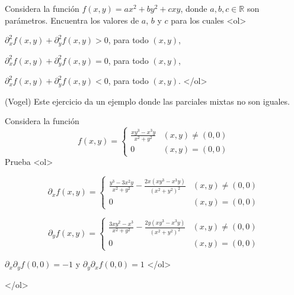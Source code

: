 \documentclass{article}
\theoremstyle{definition}
\begin{document}
                
  \item Considera la función $f(x,y)=ax^2+by^2+cxy$,
    donde $a,b,c\in \mathbb{R}$ son parámetros. Encuentra
    los valores de $a$, $b$ y $c$ para los cuales
    <ol>
    \item $\partial_x^2 f(x,y)+\partial_y^2f(x,y) >0$, para todo $(x,y)$,
    \item $\partial_x^2f(x,y)+\partial_y^2f(x,y)=0$, para todo $(x,y)$,
    \item $\partial_x^2f(x,y)+\partial_y^2f(x,y)<0$, para todo $(x,y)$.
    </ol>
                  
 
    
  \item (Vogel) Este ejercicio da un ejemplo
    donde las parciales mixtas no son iguales.

    Considera la función
    $$
    f(x,y)=\left\{
      \begin{array}{cc}
        \frac{xy^3-x^3y}{x^2+y^2} & (x,y)\ne (0,0)\\
        0 & (x,y)=(0,0)
      \end{array}
    \right.
    $$
    Prueba
    <ol>
    \item
      $$
      \partial_xf(x,y)=\left\{
        \begin{array}{cc}
          \frac{y^3-3x^2y}{x^2+y^2}- \frac{2x(xy^3-x^3y)}{(x^2+y^2)^2}
          & (x,y)\ne (0,0)\\
          0 & (x,y)=(0,0)
        \end{array}
      \right.
      $$
    \item
      $$
      \partial_y f(x,y)=\left\{
        \begin{array}{cc}
          \frac{3xy^2-x^3}{x^2+y^2}- \frac{2y(xy^3-x^3y)}{(x^2+y^2)^2}
          & (x,y)\ne (0,0)\\
          0 & (x,y)=(0,0)
        \end{array}
      \right.
      $$
      
    \item $\partial_x \partial_yf(0,0)=-1$ y $\partial_y\partial_xf(0,0)=1$
    </ol>



    
  </ol>
  
  
       
\end{document}
